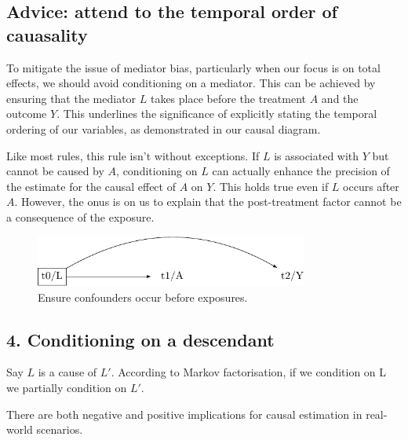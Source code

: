 \documentclass[
  singlecolumn]{report}
\begin{document}
\hypertarget{advice-attend-to-the-temporal-order-of-cauasality-2}{%
\subsection{Advice: attend to the temporal order of
cauasality}\label{advice-attend-to-the-temporal-order-of-cauasality-2}}

To mitigate the issue of mediator bias, particularly when our focus is
on total effects, we should avoid conditioning on a mediator. This can
be achieved by ensuring that the mediator \(L\) takes place before the
treatment \(A\) and the outcome \(Y\). This underlines the significance
of explicitly stating the temporal ordering of our variables, as
demonstrated in our causal diagram.

Like most rules, this rule isn't without exceptions. If \(L\) is
associated with \(Y\) but cannot be caused by \(A\), conditioning on
\(L\) can actually enhance the precision of the estimate for the causal
effect of \(A\) on \(Y\). This holds true even if \(L\) occurs after
\(A\). However, the onus is on us to explain that the post-treatment
factor cannot be a consequence of the exposure.

\begin{figure}

{\centering \includegraphics[width=0.8\textwidth,height=\textheight]{causal-dags_files/figure-pdf/fig-dag-mediator-solution-1.pdf}

}

\caption{\label{fig-dag-mediator-solution}Ensure confounders occur
before exposures.}

\end{figure}

\hypertarget{conditioning-on-a-descendant}{%
\subsection{4. Conditioning on a
descendant}\label{conditioning-on-a-descendant}}

Say \(L\) is a cause of \(L\prime\). According to Markov factorisation,
if we condition on L we partially condition on \(L\prime\).

There are both negative and positive implications for causal estimation
in real-world scenarios.
\end{document}
